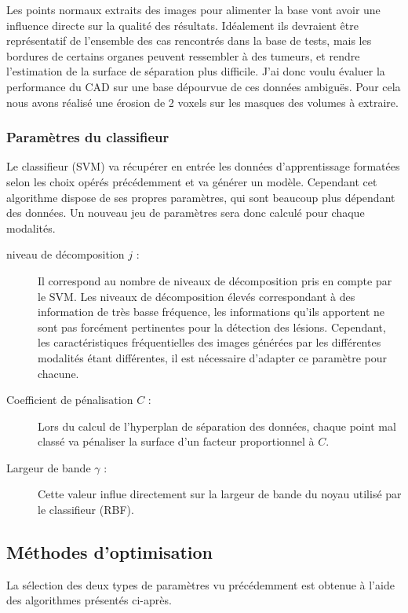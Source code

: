 Les points normaux extraits des images pour alimenter la base vont avoir une influence directe sur la qualité des résultats. Idéalement ils devraient être représentatif de l'ensemble des cas rencontrés dans la base de tests, mais les bordures de certains organes peuvent ressembler à des tumeurs, et rendre l'estimation de la surface de séparation plus difficile. J'ai donc voulu évaluer la performance du CAD sur une base dépourvue de ces données ambiguës. Pour cela nous avons réalisé une érosion de 2 voxels sur les masques des volumes à extraire.

\subsubsection{Paramètres du classifieur}

Le classifieur (SVM) va récupérer en entrée les données d'apprentissage formatées selon les choix opérés précédemment et va générer un modèle. Cependant cet algorithme dispose de ses propres paramètres, qui sont beaucoup plus dépendant des données. Un nouveau jeu de paramètres sera donc calculé pour chaque modalités.

\begin{description}
 \item[niveau de décomposition $j$ :] Il correspond au nombre de niveaux de décomposition pris en compte par le SVM. Les niveaux de décomposition élevés correspondant à des information de très basse fréquence, les informations qu'ils apportent ne sont pas forcément pertinentes pour la détection des lésions. Cependant, les caractéristiques fréquentielles des images générées par les différentes modalités étant différentes, il est nécessaire d'adapter ce paramètre pour chacune.
 \item[Coefficient de pénalisation $C$ :] Lors du calcul de l'hyperplan de séparation des données, chaque point mal classé va pénaliser la surface d'un facteur proportionnel à $C$.
 \item[Largeur de bande $\gamma$ :] Cette valeur influe directement sur la largeur de bande du noyau utilisé par le classifieur (RBF).
\end{description}

\subsection{Méthodes d'optimisation}

La sélection des deux types de paramètres vu précédemment est obtenue à l'aide des algorithmes présentés ci-après. 

